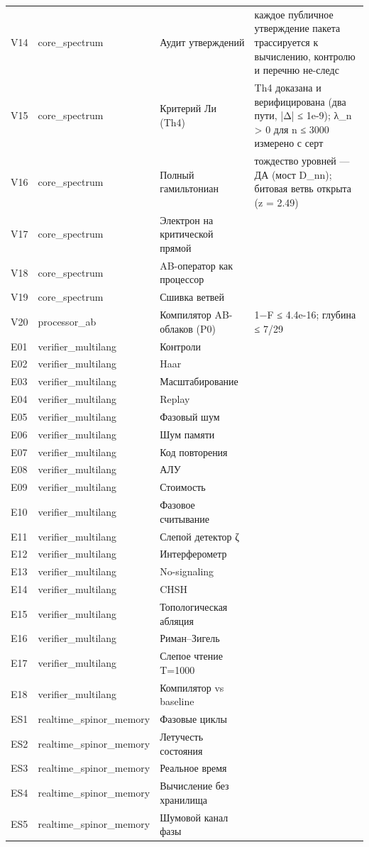 \documentclass[11pt,a4paper]{article}
\begin{document}
\begin{table}[htbp]
\begin{tabular}{p{} p{} p{} p{}}
V14 & core\_spectrum & Аудит утверждений & каждое публичное утверждение пакета трассируется к вычислению, контролю и перечню не-следс \\
V15 & core\_spectrum & Критерий Ли (Th4) & Th4 доказана и верифицирована (два пути, |Δ| ≤ 1e-9); λ\_n > 0 для n ≤ 3000 измерено с серт \\
V16 & core\_spectrum & Полный гамильтониан & тождество уровней — ДА (мост D\_nn); битовая ветвь открыта (z = 2.49) \\
V17 & core\_spectrum & Электрон на критической прямой &  \\
V18 & core\_spectrum & AB-оператор как процессор &  \\
V19 & core\_spectrum & Сшивка ветвей &  \\
V20 & processor\_ab & Компилятор AB-облаков (P0) & 1−F ≤ 4.4e-16; глубина ≤ 7/29 \\
E01 & verifier\_multilang & Контроли &  \\
E02 & verifier\_multilang & Haar &  \\
E03 & verifier\_multilang & Масштабирование &  \\
E04 & verifier\_multilang & Replay &  \\
E05 & verifier\_multilang & Фазовый шум &  \\
E06 & verifier\_multilang & Шум памяти &  \\
E07 & verifier\_multilang & Код повторения &  \\
E08 & verifier\_multilang & АЛУ &  \\
E09 & verifier\_multilang & Стоимость &  \\
E10 & verifier\_multilang & Фазовое считывание &  \\
E11 & verifier\_multilang & Слепой детектор ζ &  \\
E12 & verifier\_multilang & Интерферометр &  \\
E13 & verifier\_multilang & No-signaling &  \\
E14 & verifier\_multilang & CHSH &  \\
E15 & verifier\_multilang & Топологическая абляция &  \\
E16 & verifier\_multilang & Риман–Зигель &  \\
E17 & verifier\_multilang & Слепое чтение T=1000 &  \\
E18 & verifier\_multilang & Компилятор vs baseline &  \\
ES1 & realtime\_spinor\_memory & Фазовые циклы &  \\
ES2 & realtime\_spinor\_memory & Летучесть состояния &  \\
ES3 & realtime\_spinor\_memory & Реальное время &  \\
ES4 & realtime\_spinor\_memory & Вычисление без хранилища &  \\
ES5 & realtime\_spinor\_memory & Шумовой канал фазы &  \\
\bottomrule
\end{tabular}
\end{table}
\end{document}
